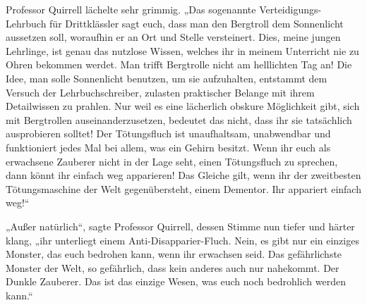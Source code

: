 Professor Quirrell lächelte sehr grimmig.
„Das sogenannte Verteidigungs-Lehrbuch für Drittklässler sagt euch, dass man den Bergtroll dem Sonnenlicht aussetzen soll, woraufhin er an Ort und Stelle versteinert. Dies, meine jungen Lehrlinge, ist genau das nutzlose Wissen, welches ihr in meinem Unterricht nie zu Ohren bekommen werdet. Man trifft Bergtrolle nicht am helllichten Tag an! Die Idee, man solle Sonnenlicht benutzen, um sie aufzuhalten, entstammt dem Versuch der Lehrbuchschreiber, zulasten praktischer Belange mit ihrem Detailwissen zu prahlen. Nur weil es eine lächerlich obskure Möglichkeit gibt, sich mit Bergtrollen auseinanderzusetzen, bedeutet das nicht, dass ihr sie tatsächlich ausprobieren solltet! Der Tötungsfluch ist unaufhaltsam, unabwendbar und funktioniert jedes Mal bei allem, was ein Gehirn besitzt. Wenn ihr euch als erwachsene Zauberer nicht in der Lage seht, einen Tötungsfluch zu sprechen, dann könnt ihr einfach weg apparieren! Das Gleiche gilt, wenn ihr der zweitbesten Tötungsmaschine der Welt gegenübersteht, einem Dementor. Ihr appariert einfach weg!“

„Außer natürlich“, sagte Professor Quirrell, dessen Stimme nun tiefer und härter klang, „ihr unterliegt einem Anti-Disapparier-Fluch. Nein, es gibt nur ein einziges Monster, das euch bedrohen kann, wenn ihr erwachsen seid. Das gefährlichste Monster der Welt, so gefährlich, dass kein anderes auch nur nahekommt. Der Dunkle Zauberer. Das ist das einzige Wesen, was euch noch bedrohlich werden kann.“

